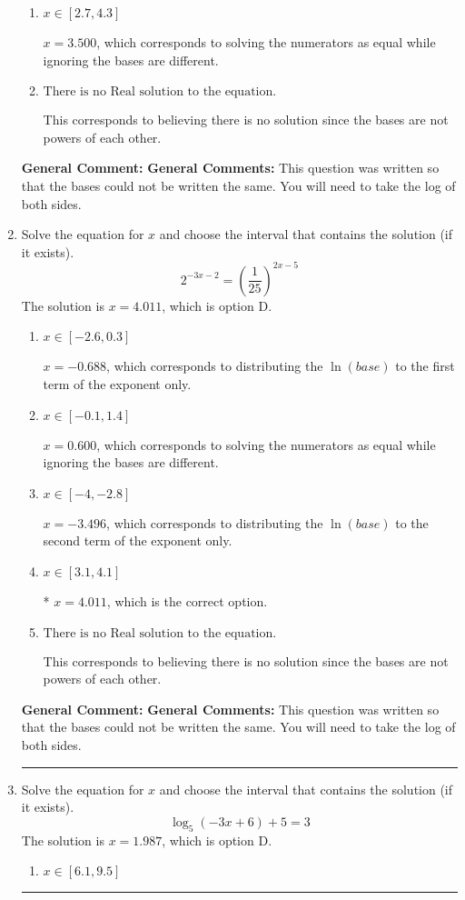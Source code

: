 \documentclass{extbook}[14pt]
\newcommand{\litem}[1]{\item #1

\rule{\textwidth}{0.4pt}}
\begin{document}
\begin{enumerate}
{\begin{enumerate}[label=\Alph*.]
$x = -6.670$, which corresponds to distributing the $\ln(base)$ to the second term of the exponent only.
\item \( x \in [2.7, 4.3] \)

$x = 3.500$, which corresponds to solving the numerators as equal while ignoring the bases are different.
\item \( \text{There is no Real solution to the equation.} \)

This corresponds to believing there is no solution since the bases are not powers of each other.
\end{enumerate}

\textbf{General Comment:} \textbf{General Comments:} This question was written so that the bases could not be written the same. You will need to take the log of both sides.
}
\litem{
Solve the equation for $x$ and choose the interval that contains the solution (if it exists).
\[ 2^{-3x-2} = \left(\frac{1}{25}\right)^{2x-5} \]The solution is \( x = 4.011 \), which is option D.\begin{enumerate}[label=\Alph*.]
\item \( x \in [-2.6, 0.3] \)

$x = -0.688$, which corresponds to distributing the $\ln(base)$ to the first term of the exponent only.
\item \( x \in [-0.1, 1.4] \)

$x = 0.600$, which corresponds to solving the numerators as equal while ignoring the bases are different.
\item \( x \in [-4, -2.8] \)

$x = -3.496$, which corresponds to distributing the $\ln(base)$ to the second term of the exponent only.
\item \( x \in [3.1, 4.1] \)

* $x = 4.011$, which is the correct option.
\item \( \text{There is no Real solution to the equation.} \)

This corresponds to believing there is no solution since the bases are not powers of each other.
\end{enumerate}

\textbf{General Comment:} \textbf{General Comments:} This question was written so that the bases could not be written the same. You will need to take the log of both sides.
}
\litem{
Solve the equation for $x$ and choose the interval that contains the solution (if it exists).
\[ \log_{5}{(-3x+6)}+5 = 3 \]The solution is \( x = 1.987 \), which is option D.\begin{enumerate}[label=\Alph*.]
\item \( x \in [6.1, 9.5] \)


\end{enumerate}}
\end{enumerate}
\end{document}
